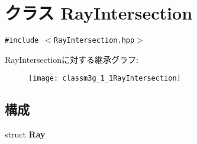 \hypertarget{classm3g_1_1RayIntersection}{
\section{クラス RayIntersection}
\label{classm3g_1_1RayIntersection}
}
{\tt \#include $<$RayIntersection.hpp$>$}

RayIntersectionに対する継承グラフ:\begin{figure}[H]
\begin{center}
\leavevmode
\texttt{[image: classm3g\_1\_1RayIntersection]}
\end{center}
\end{figure}
\subsection*{構成}
\begin{CompactItemize}
\item 
struct \textbf{Ray}
\end{CompactItemize}
